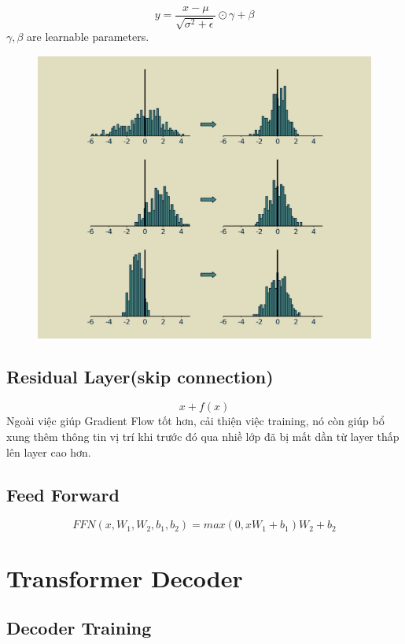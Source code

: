 \documentclass[final,letterpaper,twoside,12pt]{report}
\begin{document}
\[
	y = \dfrac{x-\mu}{\sqrt{\sigma^2 + \epsilon}} \odot \gamma + \beta
\]
$\gamma, \beta$ are learnable parameters.
\begin{figure}[h]
	\centering
	\includegraphics[width=\textwidth]{Layer normalization.png}
\end{figure}

\subsection{Residual Layer(skip connection)}

\[
	x+f(x)
\]
Ngoài việc giúp Gradient Flow tốt hơn, cải thiện việc training, nó còn giúp bổ xung thêm thông tin vị trí khi trước đó qua nhiề lớp đã bị mất dần từ layer thấp lên layer cao hơn.



\subsection{Feed Forward}

$$
	FFN(x,W_1,W_2, b_1,b_2) = max(0,xW_1+b_1)W_2+b_2
$$

\section{Transformer Decoder}

\subsection{Decoder Training}
\end{document}
